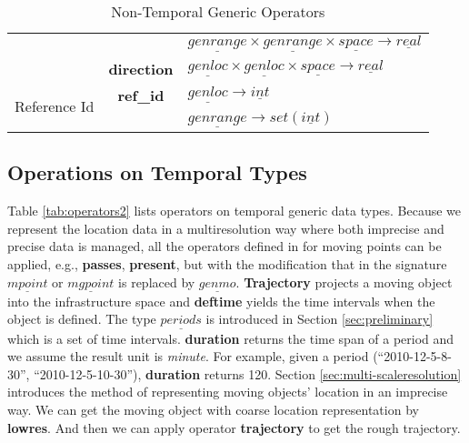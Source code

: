 \begin{table}[ht]
\begin{center}
\begin{tabular}{c|c|l}
	&&$ \underline{genrange} \times  \underline{genrange} \times \underline{space} \rightarrow {\underline{real}}$ \\
	&\textbf{direction}&$ \underline{genloc} \times  \underline{genloc} \times \underline{space} \rightarrow {\underline{real}}$ \\
	\hline
    \multirow{2}{*}{Reference Id}&\textbf{ref\_id}&$ \underline{genloc} \rightarrow \underline{int}$ \\
    &&$ \underline{genrange} \rightarrow set(\underline{int})$ \\
    \hline
  \end{tabular}
 \end{center}
 \caption{\label{tab:operators1}Non-Temporal Generic Operators }
\end{table}

\subsection{Operations on Temporal Types}
\label{sec:temporaltypes}
Table \ref{tab:operators2} lists operators on temporal generic data types. 
Because we represent the location data in a multiresolution way where both imprecise and 
precise data is managed, all the operators defined in \cite{GBE+00,GA2006} 
for moving points can be applied, e.g., \textbf{passes}, \textbf{present}, but with 
the modification that in the signature $\underline{mpoint}$ or 
$\underline{mgpoint}$ is replaced by $\underline{genmo}$. \textbf{Trajectory} projects
a moving object into the infrastructure space and \textbf{deftime} yields the time intervals when 
the object is defined. The type $\underline{periods}$ is introduced in Section \ref{sec:preliminary} which is a set of time intervals. \textbf{duration} returns the time span of a period and we assume the result unit is \textit{minute}. For example, given a period (``2010-12-5-8-30'', ``2010-12-5-10-30''), \textbf{duration} returns 120. Section \ref{sec:multi-scaleresolution} introduces the method of representing moving objects' location in an imprecise way. We can get the moving object with coarse location representation by \textbf{lowres}. And then we can apply operator \textbf{trajectory} to get the rough trajectory. \\

